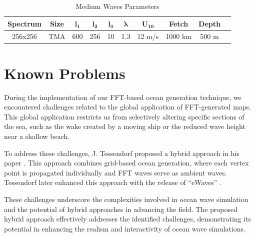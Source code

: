 \begin{table}[h]
    \centering
    \begin{tabular}{|c|c|c|c|c|c|c|c|c|c|}
        \hline
        \textbf{Spectrum} & \textbf{Size} & $\mathbf{l_1}$ & $\mathbf{l_2}$ & $\mathbf{l_3}$ & $\mathbf{\lambda}$ & $\mathbf{U_{10}}$ & \textbf{Fetch} & \textbf{Depth} \\
        \hline
        256x256 & TMA & 600 & 256 & 10 & 1.3 & 12 m/s & 1000 km & 500 m \\
        \hline
    \end{tabular}
    \caption{Medium Waves Parameters}
    \label{tab:output_1}
\end{table}

\section{Known Problems}
During the implementation of our FFT-based ocean generation technique, we encountered challenges related to the global application of FFT-generated maps. This global application restricts us from selectively altering specific sections of the sea, such as the wake created by a moving ship or the reduced wave height near a shallow beach.

To address these challenges, J. Tessendorf proposed a hybrid approach in his paper \cite{tessendorf2004}. This approach combines grid-based ocean generation, where each vertex point is propagated individually and FFT waves serve as ambient waves. Tessendorf later enhanced this approach with the release of “eWaves” \cite{tessendorf2014}.

These challenges underscore the complexities involved in ocean wave simulation and the potential of hybrid approaches in advancing the field. The proposed hybrid approach effectively addresses the identified challenges, demonstrating its potential in enhancing the realism and interactivity of ocean wave simulations.


